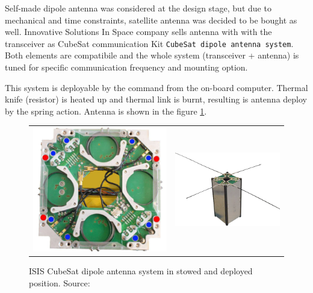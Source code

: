 Self-made dipole antenna was considered at the design stage, but due to mechanical and time constraints, satellite antenna was decided to be bought as well. Innovative Solutions In Space company sells antenna with with the transceiver as CubeSat communication Kit \texttt{CubeSat dipole antenna system}. Both elements are compatibile and the whole system (transceiver + antenna) is tuned for specific communication frequency and mounting option.

This system is deployable by the command from the on-board computer. Thermal knife (resistor) is heated up and thermal link is burnt, resulting is antenna deploy by the spring action. Antenna is shown in the figure \ref{ISIS_antenna}.

\begin{figure}
   \centering
\begin{tabular}{cc}
        \includegraphics[width=0.3\paperwidth]{img/6/isis_antenna_stowed.jpg}
    & 
        \includegraphics[width=0.45\paperwidth]{img/6/CubeSat-antenna-dipole-configuration.png}    
\end{tabular}
\label{ISIS_antenna}
\caption{ISIS CubeSat dipole antenna system in stowed and deployed position. Source: \cite{isis_dipole_antenna}}
\end{figure}


